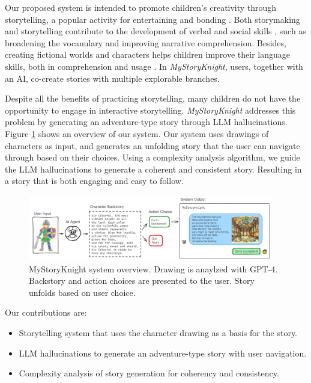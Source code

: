 \documentclass[submit,techrep,english]{ipsj}
\begin{document}
Our proposed system is intended to promote children's creativity through storytelling, a popular activity for entertaining and bonding \cite{7:SunLLL17}. Both storymaking and storytelling contribute to the development of verbal and social skills \cite{9:RyokaiC99,5:CurrinDPCFGH23}, such as broadening the vocanulary and improving  narrative comprehension. Besides, creating fictional worlds and characters helps children improve their language skills, both in comprehension and usage \cite{13:abs-2011-04242}. In \textit{MyStoryKnight}, users, together with an AI, co-create stories with multiple explorable branches.

Despite all the benefits of practicing storytelling, many children do not have the opportunity to engage in interactive storytelling. \textit{MyStoryKnight} addresses this problem by generating an adventure-type story through LLM hallucinations. Figure \ref{fig:system-overview}  shows an overview of our system. Our system uses drawings of characters as input, and generates an unfolding story that the user can navigate through based on their choices. Using a complexity analysis algorithm, we guide the LLM hallucinations to generate a coherent and consistent story. Resulting in a story that is both engaging and easy to follow.

\begin{figure}[t]
    \centering
    \includegraphics[width=0.95\textwidth]{figures/system-overview.png}
    \caption{MyStoryKnight system overview. Drawing is anaylzed with GPT-4. Backstory and action choices are presented to the user. Story unfolds based on user choice.}
    \label{fig:system-overview}
\end{figure}

Our contributions are:
\begin{itemize}
    \item Storytelling system that uses the character drawing as a basis for the story.
    \item LLM hallucinations to generate an adventure-type story with user navigation.
    \item Complexity analysis of story generation for coherency and consistency.
\end{itemize}
\end{document}
